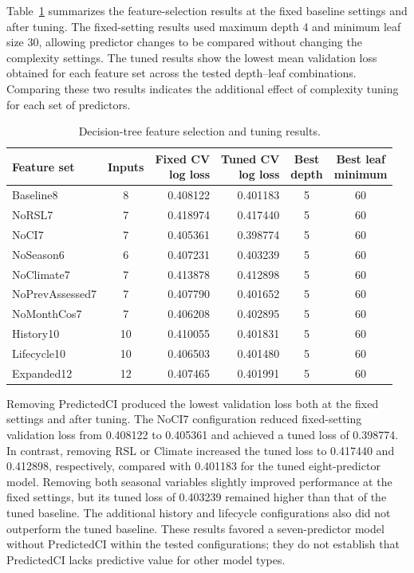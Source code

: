 \documentclass[NewProceedings,letterpaper,NoPageNumbers,NoLineNumbers, DoubleSpace]{ascelike-new}
\begin{document}
Table~\ref{tab:dt-features} summarizes the feature-selection results at the fixed baseline settings and after tuning. The fixed-setting results used maximum depth 4 and minimum leaf size 30, allowing predictor changes to be compared without changing the complexity settings. The tuned results show the lowest mean validation loss obtained for each feature set across the tested depth--leaf combinations. Comparing these two results indicates the additional effect of complexity tuning for each set of predictors.

\begin{table}[htbp]
\centering
\caption{Decision-tree feature selection and tuning results.}
\label{tab:dt-features}
\small
\renewcommand{\arraystretch}{1.15}
\setlength{\tabcolsep}{4pt}
\begin{tabularx}{\linewidth}{@{}>{\raggedright\arraybackslash}X c r r c c@{}}
\toprule
\textbf{Feature set} &
\textbf{Inputs} &
\shortstack{\textbf{Fixed CV}\\\textbf{log loss}} &
\shortstack{\textbf{Tuned CV}\\\textbf{log loss}} &
\shortstack{\textbf{Best}\\\textbf{depth}} &
\shortstack{\textbf{Best leaf}\\\textbf{minimum}} \\
\midrule
Baseline8       & 8  & 0.408122 & 0.401183 & 5 & 60 \\
NoRSL7          & 7  & 0.418974 & 0.417440 & 5 & 60 \\
NoCI7           & 7  & 0.405361 & 0.398774 & 5 & 60 \\
NoSeason6       & 6  & 0.407231 & 0.403239 & 5 & 60 \\
NoClimate7      & 7  & 0.413878 & 0.412898 & 5 & 60 \\
NoPrevAssessed7 & 7  & 0.407790 & 0.401652 & 5 & 60 \\
NoMonthCos7     & 7  & 0.406208 & 0.402895 & 5 & 60 \\
History10       & 10 & 0.410055 & 0.401831 & 5 & 60 \\
Lifecycle10     & 10 & 0.406503 & 0.401480 & 5 & 60 \\
Expanded12      & 12 & 0.407465 & 0.401991 & 5 & 60 \\
\bottomrule
\end{tabularx}
\end{table}

Removing PredictedCI produced the lowest validation loss both at the fixed settings and after tuning. The NoCI7 configuration reduced fixed-setting validation loss from 0.408122 to 0.405361 and achieved a tuned loss of 0.398774. In contrast, removing RSL or Climate increased the tuned loss to 0.417440 and 0.412898, respectively, compared with 0.401183 for the tuned eight-predictor model. Removing both seasonal variables slightly improved performance at the fixed settings, but its tuned loss of 0.403239 remained higher than that of the tuned baseline. The additional history and lifecycle configurations also did not outperform the tuned baseline. These results favored a seven-predictor model without PredictedCI within the tested configurations; they do not establish that PredictedCI lacks predictive value for other model types.
\end{document}
